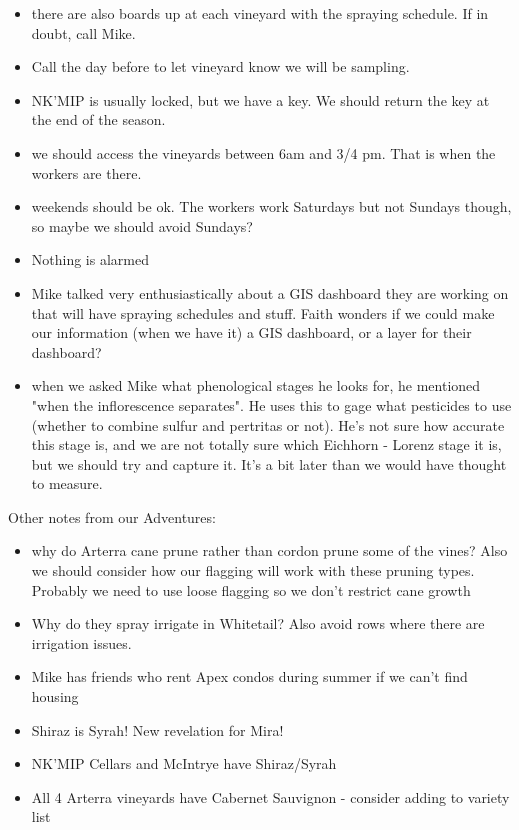 \documentclass[11pt,letter]{article}
\newenvironment{smitemize}{
\begin{itemize}
  \setlength{\itemsep}{0pt}
  \setlength{\parskip}{0.8pt}
  \setlength{\parsep}{0pt}}
{\end{itemize}
}
\begin{document}
\begin{smitemize}
\item there are also boards up at each vineyard with the spraying schedule. If in doubt, call Mike.
\item Call the day before to let vineyard know we will be sampling.
\item NK'MIP is usually locked, but we have a key. We should return the key at the end of the season.
\item we should access the vineyards between 6am and 3/4 pm. That is when the workers are there.
\item weekends should be ok. The workers work Saturdays but not Sundays though, so maybe we should avoid Sundays?
\item Nothing is alarmed
\item Mike talked very enthusiastically about a GIS dashboard they are working on that will have spraying schedules and stuff. Faith wonders if we could make our information (when we have it) a GIS dashboard, or a layer for their dashboard?
\item when we asked Mike what phenological stages he looks for, he mentioned "when the inflorescence separates". He uses this to gage what pesticides to use (whether to combine sulfur and pertritas or not). He's not sure how accurate this stage is, and we are not totally sure which Eichhorn - Lorenz stage it is, but we should try and capture it. It's a bit later than we would have thought to measure.

\end{smitemize}

Other notes from our Adventures:
\begin{smitemize}
\item why do Arterra cane prune rather than cordon prune some of the vines? Also we should consider how our flagging will work with these pruning types. Probably we need to use loose flagging so we don't restrict cane growth
\item Why do they spray irrigate in Whitetail? Also avoid rows where there are irrigation issues.
\item Mike has friends who rent Apex condos during summer if we can't find housing
\item Shiraz is Syrah! New revelation for Mira!
\item NK'MIP Cellars and McIntrye have Shiraz/Syrah
\item All 4 Arterra vineyards have Cabernet Sauvignon - consider adding to variety list

\end{smitemize}
\end{document}
